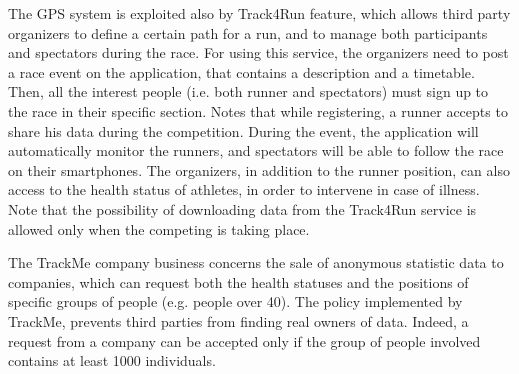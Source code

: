 The GPS system is exploited also by Track4Run feature, which allows third party organizers to define a certain path for a run, and to manage both participants and spectators during the race.
For using this service, the organizers need to post a race event on the application, that contains a description and a timetable. 
Then, all the interest people (i.e. both runner and spectators) must sign up to the race in their specific section. 
Notes that while registering, a runner accepts to share his data during the competition. 
During the event, the application will automatically monitor the runners, and spectators will be able to follow the race on their smartphones.
The organizers, in addition to the runner position, can also access to the health status of athletes, in order to intervene in case of illness. 
Note that the possibility of downloading data from the Track4Run service is allowed only when the competing is taking place. \\
\par
The TrackMe company business concerns the sale of anonymous statistic data to companies, which can request both the health statuses and the positions of specific groups of people (e.g. people over 40). 
The policy implemented by TrackMe, prevents third parties from finding real owners of data. 
Indeed, a request from a company can be accepted only if the group of people involved contains at least 1000 individuals.